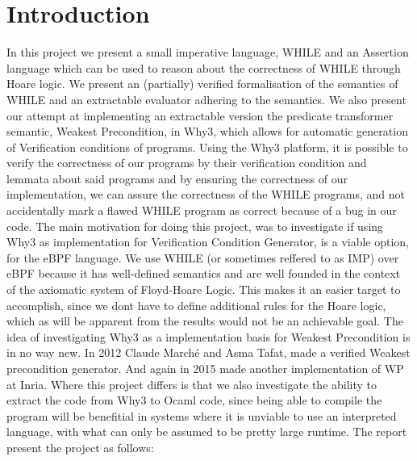 \section{Introduction}

In this project we present a small imperative language, WHILE and an Assertion language which can be used to reason about the correctness of WHILE through Hoare logic.
We present an (partially) verified formalisation of the semantics of WHILE and an extractable evaluator adhering to the semantics.
We also present our attempt at implementing an extractable version the predicate transformer semantic, Weakest Precondition, in Why3, which allows for automatic generation of Verification conditions of programs.
Using the Why3 platform, it is possible to verify the correctness of our programs by their verification condition and lemmata about said programs and by ensuring the correctness of our implementation,
we can assure the correctness of the WHILE programs, and not accidentally mark a flawed WHILE program as correct
because of a bug in our code.
The main motivation for doing this project, was to investigate if using Why3 as implementation for Verification Condition Generator, is a viable option, for the eBPF language.
We use WHILE (or sometimes reffered to as IMP) over eBPF because it has well-defined semantics and are well founded in the context of the axiomatic system of Floyd-Hoare Logic.
This makes it an easier target to accomplish, since we dont have to define additional rules for the Hoare logic, which as will be apparent from the results would not be an achievable goal.
The idea of investigating Why3 as a implementation basis for Weakest Precondition is in no way new.
In 2012 Claude Marché and Asma Tafat, made a verified Weakest precondition generator\cite{TODO WP}.
And again in 2015 made another implementation of WP at Inria\cite{WP2}.
Where this project differs is that we also investigate the ability to extract the code from Why3 to Ocaml code,
since being able to compile the program will be benefitial in systems where it is unviable to use an interpreted language, with what can only be assumed to be pretty large runtime.
The report present the project as follows:

